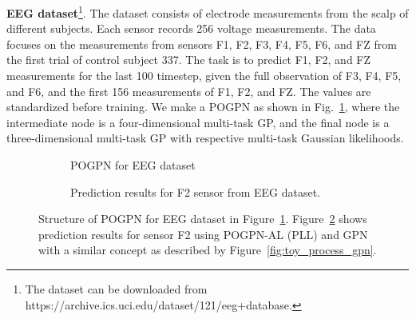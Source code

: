 \textbf{EEG dataset}\footnote{The dataset can be downloaded from https://archive.ics.uci.edu/dataset/121/eeg+database.}. The dataset consists of electrode measurements from the scalp of different subjects. Each sensor records 256 voltage measurements. The data focuses on the measurements from sensors F1, F2, F3, F4, F5, F6, and FZ from the first trial of control subject 337. The task is to predict F1, F2, and FZ measurements for the last 100 timestep, given the full observation of F3, F4, F5, and F6, and the first 156 measurements of F1, F2, and FZ. The values are standardized before training. We make a POGPN as shown in Fig.~\ref{fig:eeg_dag}, where the intermediate node is a four-dimensional multi-task GP, and the final node is a three-dimensional multi-task GP with respective multi-task Gaussian likelihoods.

\begin{figure}[h]
      \centering
      \begin{subfigure}[t]{\columnwidth}
            \centering
            
            \caption{POGPN for EEG dataset}
            \label{fig:eeg_dag}
      \end{subfigure}
      \hfill
      \begin{subfigure}[t]{\columnwidth}
            \centering
            
            \caption{Prediction results for F2 sensor from EEG dataset.}
            \label{fig:eeg_pred}
      \end{subfigure}
      \caption{Structure of POGPN for EEG dataset in Figure~\ref{fig:eeg_dag}. Figure~\ref{fig:eeg_pred} shows prediction results for sensor F2 using POGPN-AL (PLL) and GPN with a similar concept as described by Figure~\ref{fig:toy_process_gpn}.} %
      \label{fig:eeg_combined} %
      \vspace{-1em}
\end{figure}

